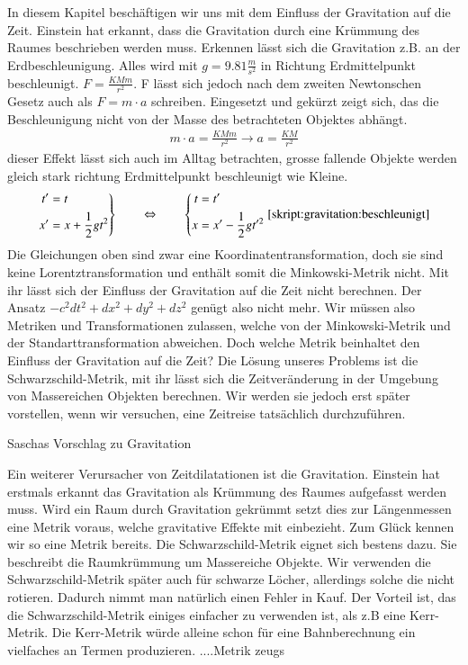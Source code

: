 \begin{refsection}
	In diesem Kapitel beschäftigen wir uns mit dem Einfluss der Gravitation auf die Zeit. Einstein hat erkannt, dass die Gravitation durch eine Krümmung des Raumes beschrieben werden muss. Erkennen lässt sich die Gravitation z.B. an der Erdbeschleunigung. Alles wird mit $g=9.81\frac{m}{s^2}$ in Richtung Erdmittelpunkt beschleunigt. $F=\frac{KMm}{r^2}$. F lässt sich jedoch nach dem zweiten Newtonschen Gesetz auch als $F=m\cdot a$ schreiben. Eingesetzt und gekürzt zeigt sich, das die Beschleunigung nicht von der Masse des betrachteten Objektes abhängt.
	\begin{align*}
		m\cdot a = \frac{KMm}{r^2} \rightarrow a=\frac{KM}{r^2} 
	\end{align*}
	dieser Effekt lässt sich auch im Alltag betrachten, grosse fallende Objekte werden gleich stark richtung Erdmittelpunkt beschleunigt wie Kleine.
	\begin{equation}
	\left.
	\begin{aligned}
	t'&=t\\
	x'&=x+\frac12gt^2
	\end{aligned}
	\right\}
	\qquad
	\Leftrightarrow
	\qquad
	\left\{
	\begin{aligned}
	t&=t'\\
	x&=x'-\frac12gt'^2
	\end{aligned}
	\right.
	\eqref{skript:gravitation:beschleunigt}
	\end{equation}
	Die Gleichungen oben sind zwar eine Koordinatentransformation, doch sie sind keine Lorentztransformation und enthält somit die Minkowski-Metrik nicht. Mit ihr lässt sich der Einfluss der Gravitation auf die Zeit nicht berechnen. 
	Der Ansatz $ -c^2dt^2 + dx^2 + dy^2 + dz^2$ genügt also nicht mehr. Wir müssen also Metriken und Transformationen zulassen, welche von der Minkowski-Metrik und der Standarttransformation abweichen.
	Doch welche Metrik beinhaltet den Einfluss der Gravitation auf die Zeit? 
	Die Lösung unseres Problems ist die Schwarzschild-Metrik, mit ihr lässt sich die Zeitveränderung in der Umgebung von Massereichen Objekten berechnen. Wir werden sie jedoch erst später vorstellen, wenn wir versuchen, eine Zeitreise tatsächlich durchzuführen. %
    
    Saschas Vorschlag zu Gravitation
    
    Ein weiterer Verursacher von Zeitdilatationen ist die Gravitation. Einstein hat erstmals erkannt das Gravitation als Krümmung des Raumes aufgefasst werden muss. Wird ein Raum durch Gravitation gekrümmt setzt dies zur Längenmessen eine Metrik voraus, welche gravitative Effekte mit einbezieht. Zum Glück kennen wir so eine Metrik bereits. Die Schwarzschild-Metrik eignet sich bestens dazu. Sie beschreibt die Raumkrümmung um Massereiche Objekte.
    Wir verwenden die Schwarzschild-Metrik später auch für schwarze Löcher, allerdings solche die nicht rotieren. Dadurch nimmt man natürlich einen Fehler in Kauf. Der Vorteil ist, das die Schwarzschild-Metrik einiges einfacher zu verwenden ist, als z.B eine Kerr-Metrik. Die Kerr-Metrik würde alleine schon für eine Bahnberechnung ein vielfaches an Termen produzieren. ....Metrik zeugs
    

\end{refsection}
